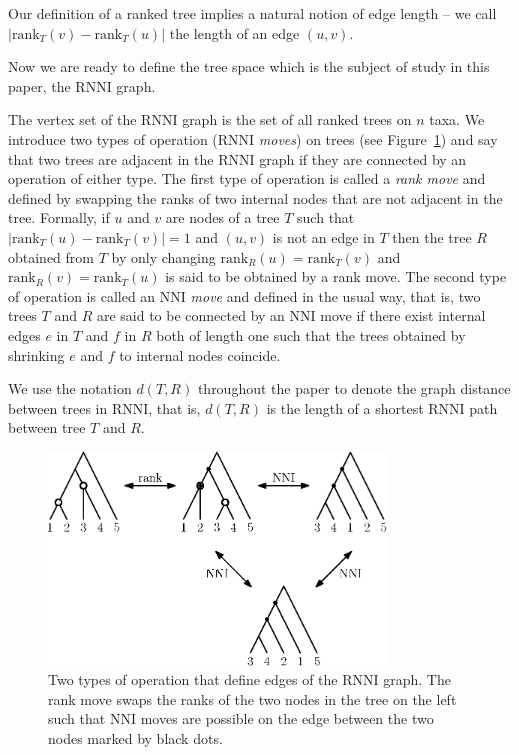 \documentclass{amsart}
\newcommand{\rank}{\mathrm{rank}}
\newcommand{\nni}{\mathrm{NNI}}
\newcommand{\rnni}{\mathrm{RNNI}}
\begin{document}
Our definition of a ranked tree implies a natural notion of edge length -- we call $|\rank_T(v) - \rank_T(u)|$ the length of an edge $(u, v)$.

Now we are ready to define the tree space which is the subject of study in this paper, the $\rnni$ graph.

The vertex set of the $\rnni$ graph is the set of all ranked trees on $n$ taxa.
We introduce two types of operation ($\rnni$ \emph{moves}) on trees (see Figure~\ref{fig:RNNI}) and say that two trees are adjacent in the $\rnni$ graph if they are connected by an operation of either type.
The first type of operation is called a \emph{rank move} and defined by swapping the ranks of two internal nodes that are not adjacent in the tree.
Formally, if $u$ and $v$ are nodes of a tree $T$ such that $|\rank_T(u) - \rank_T(v)| = 1$ and $(u, v)$ is not an edge in $T$ then the tree $R$ obtained from $T$ by only changing $\rank_R(u) = \rank_T(v)$ and $\rank_R(v) = \rank_T(u)$ is said to be obtained by a rank move.
The second type of operation is called an $\nni$ \emph{move} and defined in the usual way, that is, two trees $T$ and $R$ are said to be connected by an $\nni$ move if there exist internal edges $e$ in $T$ and $f$ in $R$ both of length one such that the trees obtained by shrinking $e$ and $f$ to internal nodes coincide.

We use the notation $d(T, R)$ throughout the paper to denote the graph distance between trees in $\rnni$, that is, $d(T, R)$ is the length of a shortest $\rnni$ path between tree $T$ and $R$.

\begin{figure}[H]
\centering
\includegraphics[width=0.8\textwidth]{RNNI}
\vspace{12pt}
\caption{Two types of operation that define edges of the $\rnni$ graph.
The rank move swaps the ranks of the two nodes in the tree on the left such that $\nni$ moves are possible on the edge between the two nodes marked by black dots.}
\label{fig:RNNI}
\end{figure}
\end{document}
